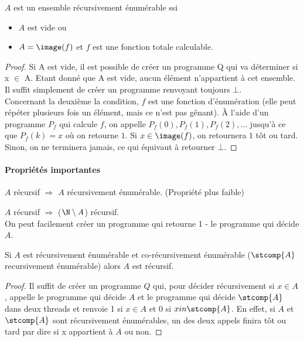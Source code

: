 \begin{myprop}
	$A$ est un ensemble récursivement énumérable ssi
    \begin{itemize}
      \item $A$ est vide ou
      \item $A = \image(f)$ et $f$ est une fonction totale calculable.
    \end{itemize}

    \begin{proof}
      Si A est vide, il est possible de créer un programme Q qui va déterminer si x $\in$ A. Etant donné que A est vide, aucun élément n'appartient à cet ensemble. Il suffit simplement de créer un programme renvoyant toujours $\bot$. \\
      Concernant la deuxième la condition, $f$ est une fonction d'énumération (elle peut répéter plusieurs fois un élément, mais ce n'est pas gênant).
      À l'aide d'un programme $P_f$ qui calcule $f$,
      on appelle $P_f(0), P_f(1), P_f(2), \ldots$
      jusqu'à ce que $P_f(k) = x$ où on retourne $1$.
      Si $x \in \image(f)$, on retournera $1$ tôt ou tard.
      Sinon, on ne terminera jamais, ce qui équivaut à retourner $\bot$.
    \end{proof}
\end{myprop}


\paragraph{Propriétés importantes}
\label{par:propri_t_s_importantes}
\begin{myprop}
	$A$ récursif $\Rightarrow$ $A$ récursivement énumérable. (Propriété plus
		faible)
\end{myprop}

\begin{myprop}
	$A$ récursif $\Rightarrow$ ($\N \setminus A$) récursif.\\ On peut facilement créer
		un programme qui retourne 1 - le programme qui décide $A$.
\end{myprop}

\begin{myprop}
    Si $A$ est récursivement énumérable et co-récursivement énumérable ($\stcomp{A}$ recursivement énumérable)
    alors $A$ est récursif.
    \begin{proof}
      Il suffit de créer un programme $Q$ qui, pour décider récursivement si $x \in A$, appelle le programme qui décide $A$ et le programme qui décide $\stcomp{A}$ dans deux threads et renvoie 1 si $x \in A$ et 0 si $x in \stcomp{A}$. En effet, si $A$ et $\stcomp{A}$ sont récursivement énumérables, un des deux appels finira tôt ou tard par dire si x appartient à $A$ ou non.
    \end{proof}
\end{myprop}

